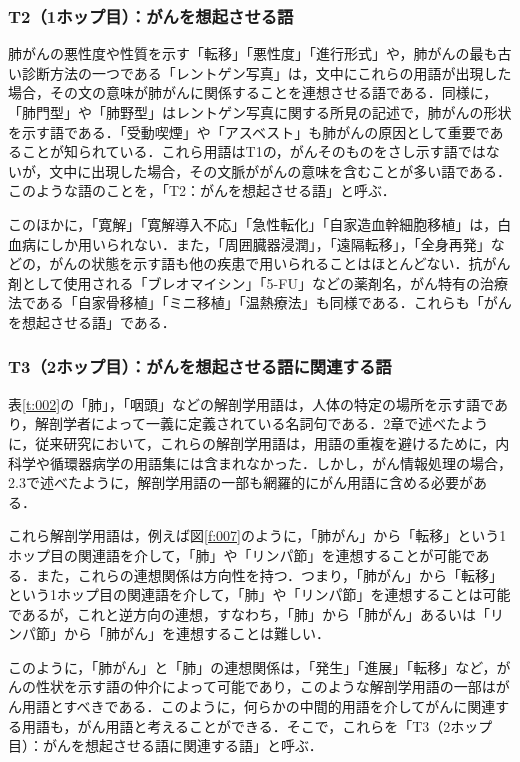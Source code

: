 \documentclass[japanese]{jnlp_1.4}
\begin{document}
\subsubsection{ T2（1ホップ目）：がんを想起させる語}
\label{s: T2（1ホップ目）：がんを想起させる語}

肺がんの悪性度や性質を示す「転移」「悪性度」「進行形式」や，肺がんの最も古い診断方法の一つである「レントゲン写真」は，文中にこれらの用語が出現した場合，その文の意味が肺がんに関係することを連想させる語である．同様に，「肺門型」や「肺野型」はレントゲン写真に関する所見の記述で，肺がんの形状を示す語である．「受動喫煙」や「アスベスト」も肺がんの原因として重要であることが知られている．これら用語はT1の，がんそのものをさし示す語ではないが，文中に出現した場合，その文脈ががんの意味を含むことが多い語である．このような語のことを，「T2：がんを想起させる語」と呼ぶ．

このほかに，「寛解」「寛解導入不応」「急性転化」「自家造血幹細胞移植」は，白血病にしか用いられない．また，「周囲臓器浸潤」，「遠隔転移」，「全身再発」などの，がんの状態を示す語も他の疾患で用いられることはほとんどない．抗がん剤として使用される「ブレオマイシン」「5-FU」などの薬剤名，がん特有の治療法である「自家骨移植」「ミニ移植」「温熱療法」も同様である．これらも「がんを想起させる語」である．


\subsubsection{T3（2ホップ目）：がんを想起させる語に関連する語}
\label{s:T3（2ホップ目）：がんを想起させる語に関連する語}

表\ref{t:002}の「肺」，「咽頭」などの解剖学用語は，人体の特定の場所を示す語であり，解剖学者によって一義に定義されている名詞句である．2章で述べたように，従来研究において，これらの解剖学用語は，用語の重複を避けるために，内科学や循環器病学の用語集には含まれなかった．しかし，がん情報処理の場合，2.3で述べたように，解剖学用語の一部も網羅的にがん用語に含める必要がある．

これら解剖学用語は，例えば図\ref{f:007}のように，「肺がん」から「転移」という1ホップ目の関連語を介して，「肺」や「リンパ節」を連想することが可能である．また，これらの連想関係は方向性を持つ．つまり，「肺がん」から「転移」という1ホップ目の関連語を介して，「肺」や「リンパ節」を連想することは可能であるが，これと逆方向の連想，すなわち，「肺」から「肺がん」あるいは「リンパ節」から「肺がん」を連想することは難しい．

このように，「肺がん」と「肺」の連想関係は，「発生」「進展」「転移」など，がんの性状を示す語の仲介によって可能であり，このような解剖学用語の一部はがん用語とすべきである．このように，何らかの中間的用語を介してがんに関連する用語も，がん用語と考えることができる．そこで，これらを「T3（2ホップ目）：がんを想起させる語に関連する語」と呼ぶ．
\end{document}
